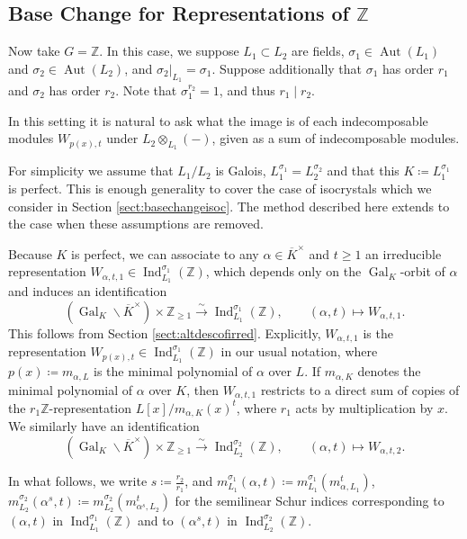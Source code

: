 \documentclass[10pt, reqno, hidelinks]{amsart}
\DeclareMathOperator{\Gal}{Gal}
\DeclareMathOperator{\Ind}{Ind}
\DeclareMathOperator{\Aut}{Aut}
\newcommand{\bZ}{{\mathbb Z}}
\numberwithin{thm}{subsection}
\theoremstyle{definition}
\begin{document}
\subsection{Base Change for Representations of $\bZ$}

Now take $G = \bZ$. In this case, we suppose $L_1 \subset L_2$ are fields, $\sigma_1 \in \Aut(L_1)$ and $\sigma_2 \in \Aut(L_2)$, and $\sigma_2|_{L_1} = \sigma_1$. Suppose additionally that $\sigma_1$ has order $r_1$ and $\sigma_2$ has order $r_2$. Note that $\sigma_1^{r_2} = 1$, and thus $r_1 \mid r_2$.

In this setting it is natural to ask what the image is of each indecomposable modules $W_{p(x),t}$ under $L_2 \otimes_{L_1} (-)$, given as a sum of indecomposable modules.

For simplicity we assume that $L_1 / L_2$ is Galois, $L_1^{\sigma_1} = L_2^{\sigma_2}$ and that this $K \coloneqq L_1^{\sigma_1}$ is perfect. This is enough generality to cover the case of isocrystals which we consider in Section \ref{sect:basechangeisoc}. The method described here extends to the case when these assumptions are removed.

Because $K$ is perfect, we can associate to any $\alpha \in \overline{K}^{\times}$ and $t \geq 1$ an irreducible representation $W_{\alpha, t, 1} \in \Ind_{L_1}^{\sigma_1}(\bZ)$, which depends only on the $\Gal_K$-orbit of $\alpha$ and induces an identification
\[
\left( \Gal_K \! \backslash \overline{K}^{\times} \right) \times \bZ_{\geq 1} \xrightarrow{\sim} \Ind_{L_1}^{\sigma_1}(\bZ), \qquad (\alpha, t) \mapsto W_{\alpha, t, 1}.
\]
This follows from Section \ref{sect:altdescofirred}. Explicitly, $W_{\alpha, t, 1}$ is the representation $W_{p(x), t} \in \Ind_{L_1}^{\sigma_1}(\bZ)$ in our usual notation, where $p(x) \coloneqq m_{\alpha, L}$ is the minimal polynomial of $\alpha$ over $L$. If $m_{\alpha, K}$ denotes the minimal polynomial of $\alpha$ over $K$, then $W_{\alpha, t, 1}$ restricts to a direct sum of copies of the $r_1 \bZ$-representation $L[x] / m_{\alpha, K}(x)^t$, where $r_1$ acts by multiplication by $x$. We similarly have an identification
\[
\left( \Gal_K \! \backslash \overline{K}^{\times} \right) \times \bZ_{\geq 1} \xrightarrow{\sim} \Ind_{L_2}^{\sigma_2}(\bZ), \qquad (\alpha, t) \mapsto W_{\alpha, t, 2}.
\]

In what follows, we write $s \coloneqq \frac{r_2}{r_1}$, and $m_{L_1}^{\sigma_1}(\alpha, t) \coloneqq m_{L_1}^{\sigma_1}(m_{\alpha, L_1}^t)$, $m_{L_2}^{\sigma_2}(\alpha^s, t) \coloneqq m_{L_2}^{\sigma_2}(m_{\alpha^s, L_2}^t)$ for the semilinear Schur indices corresponding to $(\alpha, t)$ in $\Ind_{L_1}^{\sigma_1}(\bZ)$ and to $(\alpha^s, t)$ in $\Ind_{L_2}^{\sigma_2}(\bZ)$.
\end{document}
